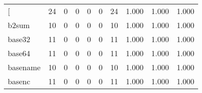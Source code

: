 \begin{longtable}{lp{2.0cm}p{2.0cm}p{2.0cm}p{2.0cm}p{2.0cm}p{2.0cm}p{2.0cm}p{2.0cm}p{2.0cm}}
\bottomrule
\endlastfoot
{[}         &                     24 &                                             0 &                                            0 &                                           0 &                                            0 &                                         24 &                                1.000 &                                  1.000 &                                1.000 \\
b2sum     &                     10 &                                             0 &                                            0 &                                           0 &                                            0 &                                         10 &                                1.000 &                                  1.000 &                                1.000 \\
base32    &                     11 &                                             0 &                                            0 &                                           0 &                                            0 &                                         11 &                                1.000 &                                  1.000 &                                1.000 \\
base64    &                     11 &                                             0 &                                            0 &                                           0 &                                            0 &                                         11 &                                1.000 &                                  1.000 &                                1.000 \\
basename  &                     10 &                                             0 &                                            0 &                                           0 &                                            0 &                                         10 &                                1.000 &                                  1.000 &                                1.000 \\
basenc    &                     11 &                                             0 &                                            0 &                                           0 &                                            0 &                                         11 &                                1.000 &                                  1.000 &                                1.000 \\

\end{longtable}
